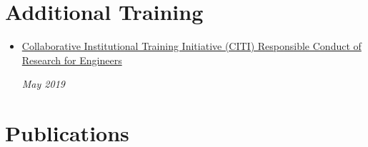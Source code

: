 \documentclass[\ifdefined\cv11pt\else10pt\fi,letterpaper]{moderncv}
\newcommand{\cvonly}[1]{\ifdefined\cv#1\fi\ignorespaces}
\renewcommand{\cvitem}[2]{\item {#1}\hfill\textit{#2}}
\let\oldsection\section
\renewcommand{\section}[1]{\vspace*{-1.3ex}\oldsection{#1}\vspace*{-0.5ex}}
\begin{document}

\section{Additional Training}
\begin{itemize}
	\cvitem{
		\parbox[t]{0.85\linewidth}{\href{https://about.citiprogram.org/en/series/responsible-conduct-of-research-rcr/}{Collaborative Institutional Training Initiative (CITI) Responsible Conduct of Research for Engineers}}}{May 2019}
\end{itemize}


\section{Publications}
	\nocite{*}
	\printbibliography[heading=none]{}
\end{document}
